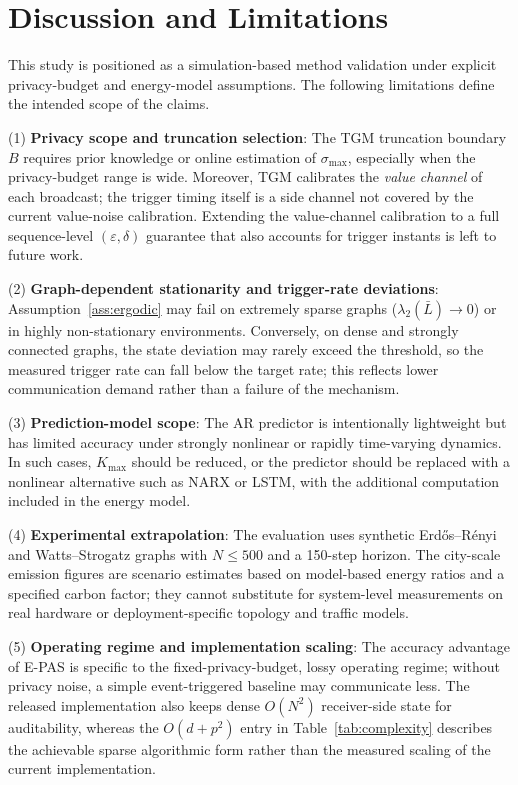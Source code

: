 \documentclass[10pt]{article}
\newcommand{\EPAS}{E-PAS}
\newcommand{\TGM}{TGM}
\newcommand{\AR}{AR}
\begin{document}
\section{Discussion and Limitations}\label{sec:discussion}

This study is positioned as a simulation-based method validation under explicit privacy-budget and energy-model assumptions. The following limitations define the intended scope of the claims.

(1) \textbf{Privacy scope and truncation selection}: The \TGM{} truncation boundary $B$ requires prior knowledge or online estimation of $\sigma_{\max}$, especially when the privacy-budget range is wide. Moreover, \TGM{} calibrates the \emph{value channel} of each broadcast; the trigger timing itself is a side channel not covered by the current value-noise calibration. Extending the value-channel calibration to a full sequence-level $(\varepsilon,\delta)$ guarantee that also accounts for trigger instants is left to future work.

(2) \textbf{Graph-dependent stationarity and trigger-rate deviations}: Assumption~\ref{ass:ergodic} may fail on extremely sparse graphs ($\lambda_2(\bar{L})\to0$) or in highly non-stationary environments. Conversely, on dense and strongly connected graphs, the state deviation may rarely exceed the threshold, so the measured trigger rate can fall below the target rate; this reflects lower communication demand rather than a failure of the mechanism.

(3) \textbf{Prediction-model scope}: The \AR{} predictor is intentionally lightweight but has limited accuracy under strongly nonlinear or rapidly time-varying dynamics. In such cases, $K_{\max}$ should be reduced, or the predictor should be replaced with a nonlinear alternative such as NARX or LSTM, with the additional computation included in the energy model.

(4) \textbf{Experimental extrapolation}: The evaluation uses synthetic Erd\H{o}s--R\'enyi and Watts--Strogatz graphs with $N\leq500$ and a 150-step horizon. The city-scale emission figures are scenario estimates based on model-based energy ratios and a specified carbon factor; they cannot substitute for system-level measurements on real hardware or deployment-specific topology and traffic models.

(5) \textbf{Operating regime and implementation scaling}: The accuracy advantage of \EPAS{} is specific to the fixed-privacy-budget, lossy operating regime; without privacy noise, a simple event-triggered baseline may communicate less. The released implementation also keeps dense $O(N^2)$ receiver-side state for auditability, whereas the $O(d+p^2)$ entry in Table~\ref{tab:complexity} describes the achievable sparse algorithmic form rather than the measured scaling of the current implementation.
\end{document}
